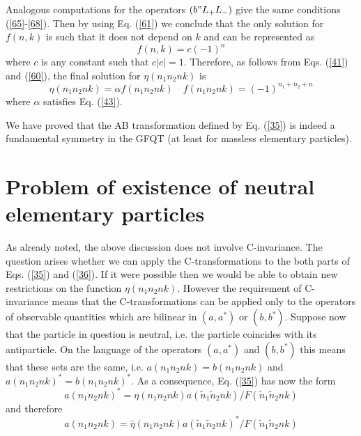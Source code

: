 \documentclass[a4paper,12pt]{article}%
\begin{document}
Analogous computations for the operators $(b"L_+L_-)$ give
the same conditions (\ref{65}-\ref{68}). Then by using Eq.
(\ref{61}) we conclude that the only solution for $f(n,k)$
is such that it does not depend on $k$ and can be represented
as 
\begin{equation}
f(n,k)=c (-1)^n 
\label{69}
\end{equation}
where $c$ is any constant such that $c|c|=1$. Therefore,
as follows from Eqs. (\ref{41}) and (\ref{60}), the
final solution for $\eta(n_1n_2nk)$ is
\begin{equation}
\eta(n_1n_2nk)=\alpha f(n_1n_2nk)\quad f(n_1n_2nk)=(-1)^{n_1+n_2+n}
\label{70}
\end{equation}
where $\alpha$ satisfies Eq. (\ref{43}).

We have proved that the AB transformation defined by Eq. 
(\ref{35}) is indeed a fundamental symmetry in the GFQT
(at least for massless elementary particles).  

\section{Problem of existence of neutral elementary particles}
\label{S6}

As already noted, the above
discussion does not involve C-invariance. 
The question arises whether we can apply the 
C-transformations to the both parts of Eqs. (\ref{35}) 
and (\ref{36}). 
If it were possible then we would be able to obtain new
restrictions on the function $\eta(n_1n_2nk)$. However the
requirement of C-invariance means that the C-transformations
can be applied only to the operators of observable
quantities which are bilinear in $(a,a^*)$ or $(b,b^*)$.
Suppose now that the particle in question is neutral, i.e.
the particle coincides with its antiparticle. On the language
of the operators $(a,a^*)$ and $(b,b^*)$ this means that these
sets are the same, i.e. $a(n_1n_2nk)=b(n_1n_2nk)$ and
$a(n_1n_2nk)^*=b(n_1n_2nk)^*$. As a consequence, Eq. 
(\ref{35}) has now the form  
\begin{equation}
a(n_1n_2nk)^*=\eta(n_1n_2nk) a({\tilde n}_1{\tilde n}_2nk)/
F({\tilde n}_1{\tilde n}_2nk) 
\label{71}
\end{equation}
and therefore 
\begin{equation}
a(n_1n_2nk)={\bar \eta}(n_1n_2nk) a({\tilde n}_1{\tilde n}_2nk)^*/
F({\tilde n}_1{\tilde n}_2nk) 
\label{72}
\end{equation}
\end{document}
